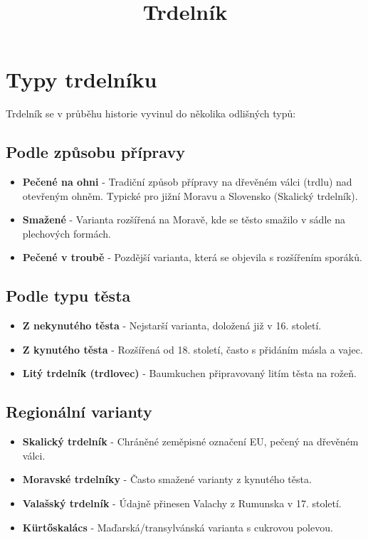 \documentclass[a5paper,10pt]{book}
\title{Trdelník}
\begin{document}
\frontmatter
\maketitle
\ifdefined\HCode\else
\tableofcontents
\fi

\mainmatter



\chapter{Typy trdelníku}
Trdelník se v průběhu historie vyvinul do několika odlišných typů:

\section{Podle způsobu přípravy}
\begin{itemize}
\item \textbf{Pečené na ohni} - Tradiční způsob přípravy na dřevěném válci (trdlu) nad otevřeným ohněm. Typické pro jižní Moravu a Slovensko (Skalický trdelník).
\item \textbf{Smažené} - Varianta rozšířená na Moravě, kde se těsto smažilo v sádle na plechových formách.
\item \textbf{Pečené v troubě} - Pozdější varianta, která se objevila s rozšířením sporáků.
\end{itemize}

\section{Podle typu těsta}
\begin{itemize}
\item \textbf{Z nekynutého těsta} - Nejstarší varianta, doložená již v 16. století.
\item \textbf{Z kynutého těsta} - Rozšířená od 18. století, často s přidáním másla a vajec.
\item \textbf{Litý trdelník (trdlovec)} - Baumkuchen připravovaný litím těsta na rožeň.
\end{itemize}

\section{Regionální varianty}
\begin{itemize}
\item \textbf{Skalický trdelník} - Chráněné zeměpisné označení EU, pečený na dřevěném válci.
\item \textbf{Moravské trdelníky} - Často smažené varianty z kynutého těsta.
\item \textbf{Valašský trdelník} - Údajně přinesen Valachy z Rumunska v 17. století.
\item \textbf{Kürtőskalács} - Maďarská/transylvánská varianta s cukrovou polevou.
\end{itemize}
\end{document}

